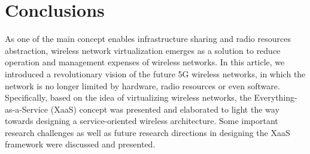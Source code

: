 \documentclass[12pt,draftclsnofoot,onecolumn]{IEEEtran}
\begin{document}
\section{Conclusions}
As one of the main concept enables infrastructure sharing and
radio resources abstraction, wireless network virtualization
emerges as a solution to reduce operation and management expenses
of wireless networks. In this article, we introduced a
revolutionary vision of the future 5G wireless networks, in which
the network is no longer limited by hardware, radio resources or
even software. Specifically, based on the idea of virtualizing
wireless networks, the Everything-as-a-Service (XaaS) concept was
presented and elaborated to light the way towards designing a
service-oriented wireless architecture. Some important research
challenges as well as future research directions in designing the
XaaS framework were discussed and presented.
\end{document}
